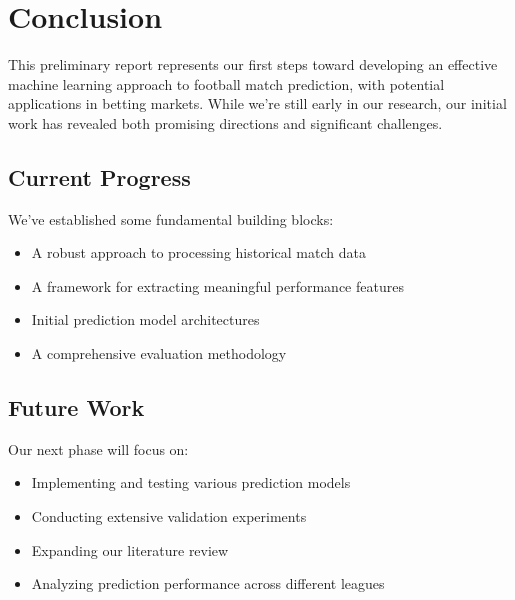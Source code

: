 \documentclass[conference]{IEEEtran}
\begin{document}
\section{Conclusion}
This preliminary report represents our first steps toward developing an effective machine learning approach to football match prediction, with potential applications in betting markets. While we're still early in our research, our initial work has revealed both promising directions and significant challenges.

\subsection{Current Progress}
We've established some fundamental building blocks:
\begin{itemize}
\item A robust approach to processing historical match data
\item A framework for extracting meaningful performance features
\item Initial prediction model architectures
\item A comprehensive evaluation methodology
\end{itemize}

\subsection{Future Work}
Our next phase will focus on:
\begin{itemize}
\item Implementing and testing various prediction models
\item Conducting extensive validation experiments
\item Expanding our literature review
\item Analyzing prediction performance across different leagues
\end{itemize}
\end{document}
